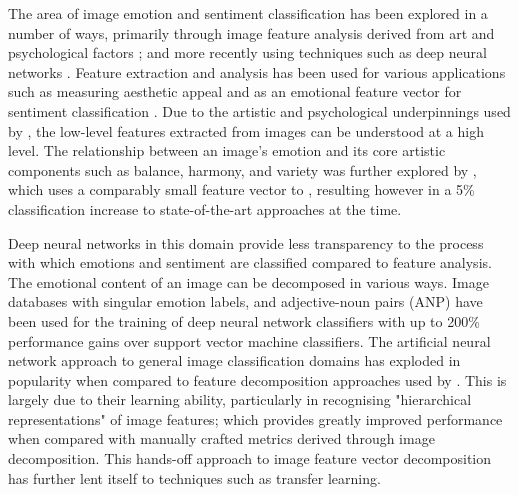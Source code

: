 \documentclass{article}
\begin{document}
The area of image emotion and sentiment classification has been explored in a number of ways, primarily through image feature analysis derived from art and psychological factors \citep{machajdik2010affective}; and more recently using techniques such as deep neural networks \citep{chen2015learning, kim2018building}.
Feature extraction and analysis has been used for various applications such as measuring aesthetic appeal \citep{den2010using,den2010comparing,den2011evolving} and as an emotional feature vector for sentiment classification \citep{machajdik2010affective}.
Due to the artistic and psychological underpinnings used by \citet{machajdik2010affective}, the low-level features extracted from images can be understood at a high level.
The relationship between an image's emotion and its core artistic components such as balance, harmony, and variety was further explored by \citet{zhao2014exploring}, which uses a comparably small feature vector to \citet{machajdik2010affective}, resulting however in a 5\% classification increase to state-of-the-art approaches at the time.

Deep neural networks in this domain provide less transparency to the process with which emotions and sentiment are classified compared to feature analysis.
The emotional content of an image can be decomposed in various ways.
Image databases with singular emotion labels, and adjective-noun pairs (ANP) have been used for the training of deep neural network classifiers \citep{chen2014deepsentibank, yang2018visual} with up to 200\% performance gains over support vector machine classifiers.
The artificial neural network approach to general image classification domains has exploded in popularity when compared to feature decomposition approaches used by \citet{machajdik2010affective}.
This is largely due to their learning ability, particularly in recognising "hierarchical representations" \citep{lipton2015critical} of image features; which provides greatly improved performance when compared with manually crafted metrics derived through image decomposition.
This hands-off approach to image feature vector decomposition has further lent itself to techniques such as transfer learning.
\end{document}
